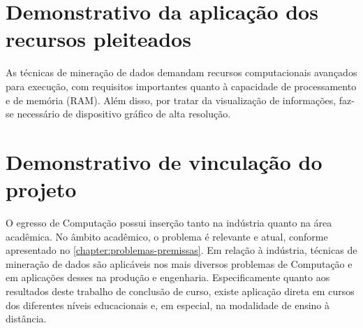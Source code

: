 \chapter{Demonstrativo da aplicação dos recursos pleiteados}

As técnicas de mineração de dados demandam recursos computacionais avançados para
execução, com requisitos importantes quanto à capacidade de processamento e de
memória (RAM). Além disso, por tratar da visualização de informações, faz-se 
necessário de dispositivo gráfico de alta resolução.




\chapter{Demonstrativo de vinculação do projeto}

O egresso de Computação possui inserção tanto na indústria quanto na área acadêmica.
No âmbito acadêmico, o problema é relevante e atual, conforme apresentado no
\cref{chapter:problemas-premissas}. Em relação à indústria,
técnicas de mineração de dados são aplicáveis nos mais diversos problemas
de Computação e em aplicações desses na produção e engenharia. Especificamente quanto
aos resultados deste trabalho de conclusão de curso, existe aplicação direta em cursos
dos diferentes níveis educacionais e, em especial, na modalidade de ensino à distância.

